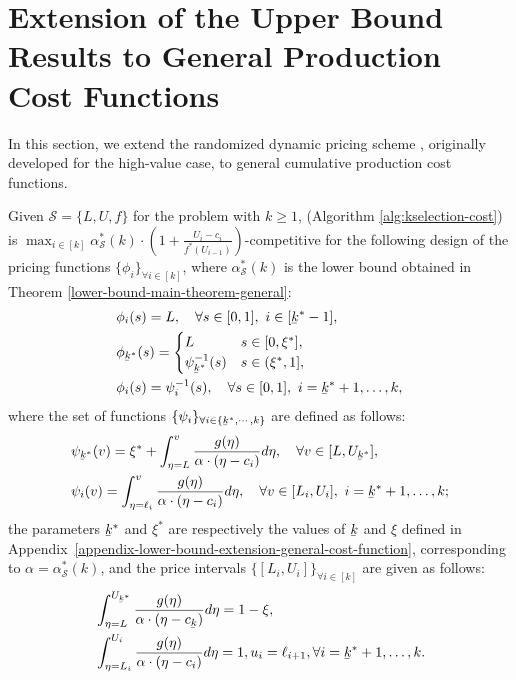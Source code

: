\section{Extension of the Upper Bound Results to General Production Cost Functions}
\label{appendix:upper-bound-general-cost-function}
In this section, we extend the randomized dynamic pricing scheme \rDynamic, originally developed for the high-value case, to general cumulative production cost functions.
\vspace{-0.1cm}
\begin{theorem}\label{thm:upper-bound-general-cost-function}
        Given $\mathcal{S} = \{L, U, f\} $ for the \OSDoS problem with $k \ge 1$,  \rDynamic (Algorithm \ref{alg:kselection-cost}) is $\max_{{i \in [k]}} \alpha_{\mathcal{S}}^*(k) \cdot (1+\frac{U_{i}-c_{i}}{f^{*}(U_{i-1})})$-competitive for the following design of the pricing functions $\{\phi_{i}\}_{\forall i \in [k]}$, where $\alpha_{\mathcal{S}}^*(k)$ is the lower bound obtained in Theorem \ref{lower-bound-main-theorem-general}: 
        \begin{align*}
            & \phi_{i}(s) = L, \quad \forall s \in [0,1], \ i \in [\ubar{k}^{*}-1],  \\
        &  \phi_{\ubar{k}^{*}}(s) = \begin{cases}
                L &  s \in [0,\xi^{*}], \\
            \psi_{\ubar{k}^{*}}^{-1}(s) & s \in (\xi^{*},1],
            \end{cases} \\
            & \phi_{i}(s) = \psi^{-1}_{i}(s), \quad \forall s \in [0,1], \ i = \ubar{k}^{*}+1,\dots,k,
        \end{align*}
where the set of functions $\{\psi_{i}\}_{\forall i \in \{\ubar{k}^{*},\cdots, k\}} $ are defined as follows:
\begin{align*}
&\psi_{\ubar{k}^{*}}(v) = 
         \xi^{*} + \int_{\eta=L}^{v} \frac{g(\eta)}{\alpha \cdot (\eta -c_{i})} d\eta, \quad \forall v \in [L,U_{\ubar{k}^{*}}], \\
&\psi_{i}(v) =
          \int_{\eta=\ell_{i}}^{v} \frac{g(\eta)}{\alpha \cdot (\eta -c_{i})} d\eta, \quad  \forall v \in [L_{i},U_{i}],\  i = \ubar{k}^{*}+1, \dots ,k; \\
\end{align*}
the parameters $\ubar{k}^{*} $ and $ \xi^{*} $ are respectively the values of $  \ubar{k} $ and $ \xi $ defined in Appendix~\ref{appendix-lower-bound-extension-general-cost-function}, corresponding to $ \alpha = \alpha_{\mathcal{S}}^*(k) $, and the price intervals $ \{[L_i, U_i]\}_{\forall i\in [k]} $ are given as follows:
\begin{align*}
     &  \int_{\eta = L}^{U_{\ubar{k}^{*}}} \frac{g(\eta)}{\alpha \cdot (\eta-c_{\ubar{k}})} d\eta = 1 - \xi, \\
     & \int_{\eta = L_{i}}^{U_{i}} \frac{g(\eta)}{\alpha \cdot (\eta-c_{i})}  d\eta = 1, u_{i} = \ell_{i+1}, \forall i = \ubar{k}^{*}+1, \dots ,k.
\end{align*}
\end{theorem}

